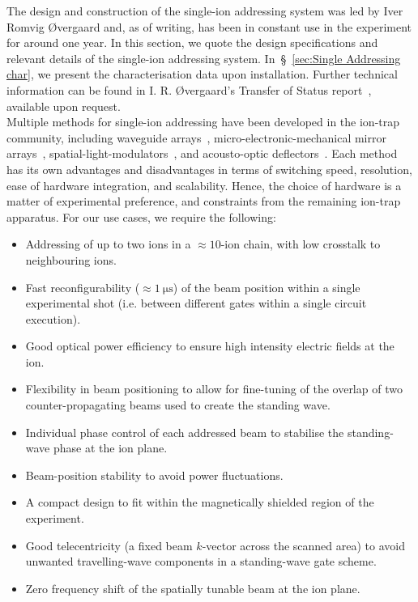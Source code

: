     The design and construction of the single-ion addressing system was led by Iver Romvig
    {\O}vergaard and, as of writing, has been in constant use in the experiment
    for around one year. In this section, we quote the design specifications and relevant
    details of the single-ion addressing system. In~\S~\ref{sec:Single
    Addressing char}, we present the characterisation data upon installation.
    Further technical information can be found in I. R. {\O}vergaard's Transfer
    of Status report~\cite{oevergaard_transfer_2025}, available upon request. \\

    Multiple methods for single-ion addressing have been developed in the ion-trap community, including waveguide arrays~\cite{sotirova_high-fidelity_2024,
    mehta_integrated_2020}, micro-electronic-mechanical mirror arrays~\cite{crain_individual_2014, wang_high-fidelity_2020}, spatial-light-modulators~\cite{mazzanti_alignment_2024}, and
    acousto-optic deflectors~\cite{pogorelov_compact_2021,pernthaler_single_nodate}. Each method has its own advantages and
    disadvantages in terms of switching speed, resolution, ease of hardware integration, and
    scalability. Hence, the choice of hardware is a matter of experimental
    preference, and constraints from the remaining ion-trap apparatus.
    For our use cases, we require the following:
    \begin{itemize}
        \item Addressing of up to two ions in a $\approx10$-ion chain, with low crosstalk to neighbouring ions.
        \item Fast reconfigurability ($\approx 1~\unit{\micro\second}$) of the beam position within a single experimental shot (i.e. between different gates within a single circuit execution).
        \item Good optical power efficiency to ensure high intensity electric fields at the ion. 
        \item Flexibility in beam positioning to allow for fine-tuning of the overlap of two counter-propagating beams used to create the standing wave.
        \item Individual phase control of each addressed beam to stabilise the standing-wave phase at the ion plane.
        \item Beam-position stability to avoid power fluctuations.
        \item A compact design to fit within the magnetically shielded region of the experiment.
        \item Good telecentricity (a fixed beam $k$-vector across the scanned area) to avoid unwanted travelling-wave components in a standing-wave gate scheme.
        \item Zero frequency shift of the spatially tunable beam at the ion plane.
    \end{itemize}

